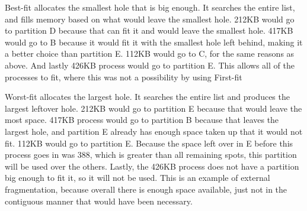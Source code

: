 \documentclass[letterpaper, 10pt,DIV=13]{scrartcl}
\numberwithin{equation}{section} %
\numberwithin{figure}{section} %
\numberwithin{table}{section} %
\begin{document}
Best-fit allocates the smallest hole that is big enough. It searches the entire list, and fills memory based on what would leave the smallest hole. 
	212KB would go to partition D because that can fit it and would leave the smallest hole. 417KB would go to B because it would fit it with the smallest hole left behind, making it a better choice than partition E. 112KB would go to C, for the same reasons as above. And lastly 426KB process would go to partition E. This allows all of the processes to fit, where this was not a possibility by using First-fit

Worst-fit allocates the largest hole. It searches the entire list and produces the largest leftover hole. 
	212KB would go to partition E because that would leave the most space. 417KB process would go to partition B because that leaves the largest hole, and partition E already has enough space taken up that it would not fit. 112KB would go to partition E. Because the space left over in E before this process goes in was 388, which is greater than all remaining spots, this partition will be used over the others. Lastly, the 426KB process does not have a partition big enough to fit it, so it will not be used. This is an example of external fragmentation, because overall there is enough space available, just not in the contiguous manner that would have been necessary. 
\end{document}
